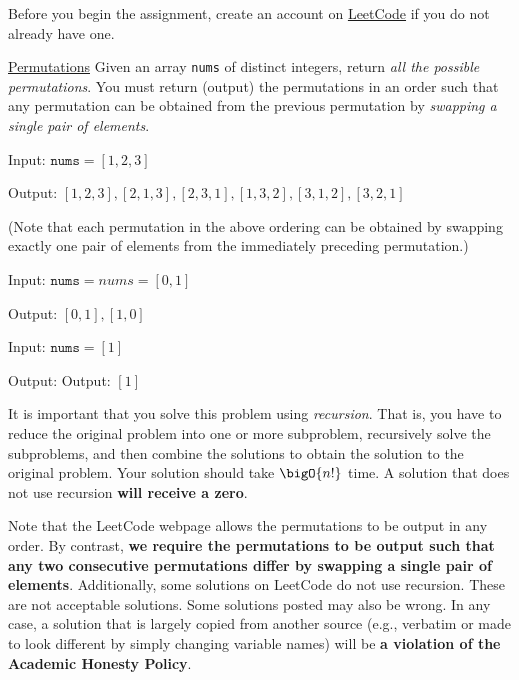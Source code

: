 \documentclass[final]{article}
\begin{document}
\begin{titlepage}
    Before you begin the assignment, create an account on \href{https://leetcode.com/}{LeetCode} if you do not already have one.

    \begin{problem}{\href{https://leetcode.com/problems/permutations/}{Permutations}}{}
    Given an array \texttt{nums} of distinct integers, return \emph{all the possible permutations}. You must return (output) the permutations in an order such that any permutation can be obtained from the previous permutation  by \emph{swapping a single pair of elements}.
    \end{problem}

    \begin{example}{}{}
        Input: $\texttt{nums} = [1,2,3]$

        Output: \noindent $[1, 2, 3], [2, 1, 3], [2, 3, 1], [1, 3, 2], [3, 1, 2], [3, 2, 1]$
        
        (Note that each permutation in the above ordering can be obtained by swapping exactly one pair of elements
        from the immediately preceding permutation.)

    \end{example}

    \begin{example}{}{}
        Input: $\texttt{nums} = nums = [0,1]$

        Output: \noindent $[0, 1], [1, 0]$
    \end{example}

    \begin{example}{}{}
        Input: $\texttt{nums} = [1]$

        Output: \noindent Output: $[1]$
    \end{example}

    It is important that you solve this problem using \emph{recursion}. That is, you have to reduce the original problem into one or more subproblem, recursively solve the subproblems, and then combine the solutions to obtain the solution to the original problem. Your solution should take $\bigO{n!}$ time. A solution that does not use recursion \textbf{will receive a zero}.

    Note that the LeetCode webpage allows the permutations to be output in any order. By contrast, \textbf{we require the permutations to be output such that any two consecutive permutations differ by swapping a single pair of elements}. Additionally, some solutions on LeetCode do not use recursion. These are not acceptable solutions. Some solutions posted may also be wrong. In any case,
    a solution that is largely copied from another source (e.g., verbatim or made to look different by simply changing variable names) will be \textbf{a violation of the Academic Honesty Policy}.


\end{titlepage}
\end{document}
